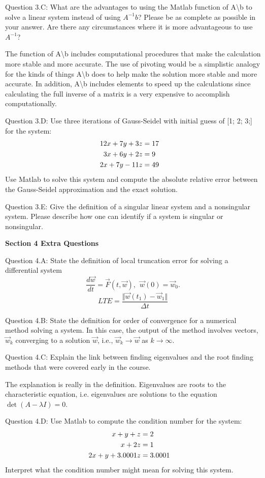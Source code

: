 \documentclass{article}
\def\ds{\displaystyle}
\begin{document}
\par \medskip \noindent 
%
Question 3.C: What are the advantages to using the Matlab function of A\textbackslash b to solve a linear system instead of using $\ds A^{-1}b$? Please be as complete as possible in your answer. Are there any circumstances where it is more advantageous to use $\ds A^{-1}$?\par
{\color{teal} The function of A\textbackslash b includes computational procedures that make the calculation more stable and more accurate. The use of pivoting would be a simplistic analogy for the kinds of things A\textbackslash b does to help make the solution more stable and more accurate. In addition, A\textbackslash b includes elements to speed up the calculations since calculating the full inverse of a matrix is a very expensive to accomplish computationally. }
\par \medskip \noindent 
%
Question 3.D:  Use three iterations of Gauss-Seidel with initial guess of [1; 2; 3;] for the system:
\begin{align*}
    12x + 7y + 3z &= 17 \cr 
    3x + 6y + 2z  &= 9 \cr
    2x + 7y - 11z &= 49
\end{align*}
Use Matlab to solve this system and compute the absolute relative error between the Gauss-Seidel approximation and the exact solution. 
\par \medskip \noindent 
%
Question 3.E: Give the definition of a singular linear system and a nonsingular system. Please describe how one can identify if a system is singular or nonsingular. 
%
\par \bigskip \noindent 
{\bf Section 4 Extra Questions}\\
\par \medskip \noindent 
Question 4.A: State the definition of local truncation error for solving a differential system
$$\frac {d\vec w}{dt} = \vec F(t,\vec w), \ \ \vec w(0)=\vec w_0.$$
{\color{teal}
$$LTE=\frac {\Vert \vec w(t_1)-\vec w_1 \Vert}{\Delta t}$$}
\par \medskip \noindent 
Question 4.B: State the definition for order of convergence for a numerical method solving a system. In this case, the output of the method involves vectors, $\ds \vec w_k$ converging to a solution $\ds \vec w$, i.e., $\ds \vec w_k \rightarrow \vec w$ as $k\rightarrow \infty$.
\par \medskip \noindent 
Question 4.C: Explain the link between finding eigenvalues and the root finding methods that were covered early in the course. \par
{\color{teal} The explanation is really in the definition. Eigenvalues are roots to the characteristic equation, i.e. eigenvalues are solutions to the equation $\ds \det (A - \lambda I) = 0$. }
\par \medskip \noindent 
Question 4.D: Use Matlab to compute the condition number for the system:
\begin{align*}
    x + y + z &= 2\cr 
    x + 2z  &= 1 \cr
    2x + y + 3.0001z &= 3.0001
\end{align*}
Interpret what the condition number might mean for solving this system. 
\end{document}
